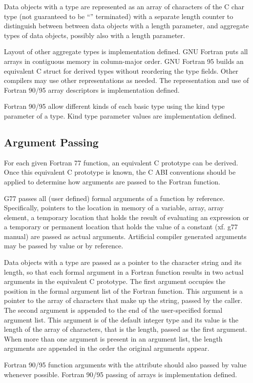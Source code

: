 Data objects with a  type are represented as an array
of characters of the C char type (not guaranteed to be
``'' terminated) with a separate length counter to
distinguish between between  data objects with a
length parameter, and aggregate types of  data
objects, possibly also with a length parameter.

Layout of other aggregate types is implementation defined.  GNU
Fortran puts all arrays in contiguous memory in column-major order.
GNU Fortran 95 builds an equivalent C struct for derived types without
reordering the type fields.  Other compilers may use other
representations as needed.  The representation and use of Fortran
90/95 array descriptors is implementation defined.

Fortran 90/95 allow different kinds of each basic type using the kind
type parameter of a type.  Kind type parameter values are
implementation defined.


\subsection{Argument Passing}

For each given Fortran 77 function, an equivalent C prototype can be
derived. Once this equivalent C prototype is known, the C ABI
conventions should be applied to determine how arguments are passed to
the Fortran function.

G77 passes all (user defined) formal arguments of a function by
reference.  Specifically, pointers to the location in memory of a
variable, array, array element, a temporary location that holds the
result of evaluating an expression or a temporary or permanent
location that holds the value of a constant (xf. g77 manual) are
passed as actual arguments. Artificial compiler generated arguments
may be passed by value or by reference.

Data objects with a  type are passed as a pointer to
the character string and its length, so that each 
formal argument in a Fortran function results in two actual arguments
in the equivalent C prototype.  The first argument occupies the
position in the formal argument list of the Fortran function.  This
argument is a pointer to the array of characters that make up the
string, passed by the caller.  The second argument is appended to the
end of the user-specified formal argument list.  This argument is of
the default integer type and its value is the length of the array of
characters, that is the length, passed as the first argument.  When
more than one  argument is present in an argument
list, the length arguments are appended in the order the original
arguments appear.

Fortran 90/95 function arguments with the  attribute
should also passed by value whenever possible.  Fortran 90/95 passing
of arrays is implementation defined.


